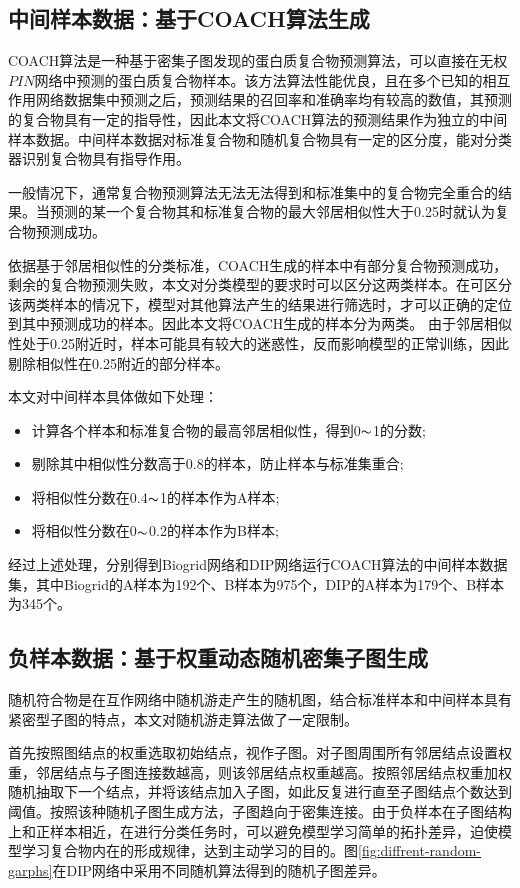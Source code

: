 \subsection{中间样本数据：基于COACH算法生成}
\label{subsection:allSample:middleSampleData}

COACH算法是一种基于密集子图发现的蛋白质复合物预测算法，可以直接在无权$PIN$网络中预测的蛋白质复合物样本。该方法算法性能优良，且在多个已知的相互作用网络数据集中预测之后，预测结果的召回率和准确率均有较高的数值，其预测的复合物具有一定的指导性，因此本文将COACH算法的预测结果作为独立的中间样本数据。中间样本数据对标准复合物和随机复合物具有一定的区分度，能对分类器识别复合物具有指导作用。

一般情况下，通常复合物预测算法无法无法得到和标准集中的复合物完全重合的结果。当预测的某一个复合物其和标准复合物的最大邻居相似性大于0.25时就认为复合物预测成功。

依据基于邻居相似性的分类标准，COACH生成的样本中有部分复合物预测成功，剩余的复合物预测失败，本文对分类模型的要求时可以区分这两类样本。在可区分该两类样本的情况下，模型对其他算法产生的结果进行筛选时，才可以正确的定位到其中预测成功的样本。因此本文将COACH生成的样本分为两类。
由于邻居相似性处于0.25附近时，样本可能具有较大的迷惑性，反而影响模型的正常训练，因此剔除相似性在0.25附近的部分样本。

本文对中间样本具体做如下处理：
\begin{itemize}
    \item 计算各个样本和标准复合物的最高邻居相似性，得到0$\thicksim$1的分数;
    \item 剔除其中相似性分数高于0.8的样本，防止样本与标准集重合;
    \item 将相似性分数在0.4$\thicksim$1的样本作为A样本;
    \item 将相似性分数在0$\thicksim$0.2的样本作为B样本;
\end{itemize}

经过上述处理，分别得到Biogrid网络和DIP网络运行COACH算法的中间样本数据集，其中Biogrid的A样本为192个、B样本为975个，DIP的A样本为179个、B样本为345个。

\subsection{负样本数据：基于权重动态随机密集子图生成}
\label{subsection:allSample:negtiveSampleData}


随机符合物是在互作网络中随机游走产生的随机图，结合标准样本和中间样本具有紧密型子图的特点，本文对随机游走算法做了一定限制。

首先按照图结点的权重选取初始结点，视作子图。对子图周围所有邻居结点设置权重，邻居结点与子图连接数越高，则该邻居结点权重越高。按照邻居结点权重加权随机抽取下一个结点，并将该结点加入子图，如此反复进行直至子图结点个数达到阈值。按照该种随机子图生成方法，子图趋向于密集连接。由于负样本在子图结构上和正样本相近，在进行分类任务时，可以避免模型学习简单的拓扑差异，迫使模型学习复合物内在的形成规律，达到主动学习的目的。图\ref{fig:diffrent-random-garphs}在DIP网络中采用不同随机算法得到的随机子图差异。

